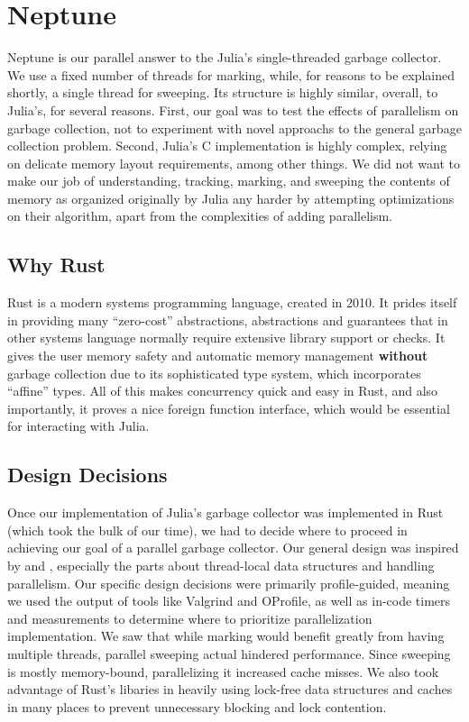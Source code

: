 \section{Neptune} \label{neptune}

Neptune is our parallel answer to the Julia's single-threaded garbage collector.
We use a fixed number of threads for marking, while, for reasons to be explained shortly, a single thread for sweeping.
Its structure is highly similar, overall, to Julia's, for several reasons.
First, our goal was to test the effects of parallelism on garbage collection, not to experiment with novel approachs to the general garbage collection problem.
Second, Julia's C implementation is highly complex, relying on delicate memory layout requirements, among other things.
We did not want to make our job of understanding, tracking, marking, and sweeping the contents of memory as organized originally by Julia any harder by attempting optimizations on their algorithm, apart from the complexities of adding parallelism.

\subsection{Why Rust}
Rust is a modern systems programming language, created in 2010.
It prides itself in providing many ``zero-cost'' abstractions, abstractions and guarantees that in other systems language normally require extensive library support or checks.
It gives the user memory safety and automatic memory management \textbf{without} garbage collection due to its sophisticated type system, which incorporates ``affine'' types.
All of this makes concurrency quick and easy in Rust, and also importantly, it proves a nice foreign function interface, which would be essential for interacting with Julia.

\subsection{Design Decisions}
Once our implementation of Julia's garbage collector was implemented in Rust (which took the bulk of our time), we had to decide where to proceed in achieving our goal of a parallel garbage collector.
Our general design was inspired by \cite{marlow2008parallel} and \cite{marlow2011multicore}, especially the parts about thread-local data structures and handling parallelism.
Our specific design decisions were primarily profile-guided, meaning we used the output of tools like Valgrind and OProfile, as well as in-code timers and measurements to determine where to prioritize parallelization implementation.
We saw that while marking would benefit greatly from having multiple threads, parallel sweeping actual hindered performance.
Since sweeping is mostly memory-bound, parallelizing it increased cache misses.
We also took advantage of Rust's libaries in heavily using lock-free data structures and caches in many places to prevent unnecessary blocking and lock contention.

